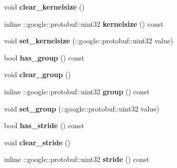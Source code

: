 \begin{DoxyCompactItemize}
void {\bfseries clear\+\_\+kernelsize} ()
\item 
\mbox{\label{classcaffe_1_1_v0_layer_parameter_a2039ba5348d4cca17386a80ba66043ca}} 
inline \+::google\+::protobuf\+::uint32 {\bfseries kernelsize} () const
\item 
\mbox{\label{classcaffe_1_1_v0_layer_parameter_a6a58c531a104ce76eb4df721dcf96f38}} 
void {\bfseries set\+\_\+kernelsize} (\+::google\+::protobuf\+::uint32 value)
\item 
\mbox{\label{classcaffe_1_1_v0_layer_parameter_ac11e4249cb00f5e912d9ad93afa9e13a}} 
bool {\bfseries has\+\_\+group} () const
\item 
\mbox{\label{classcaffe_1_1_v0_layer_parameter_af5c1bd1b8091003d1c8c41d645831b52}} 
void {\bfseries clear\+\_\+group} ()
\item 
\mbox{\label{classcaffe_1_1_v0_layer_parameter_a37765e6cfb839f95a3a108c8e8e1cb07}} 
inline \+::google\+::protobuf\+::uint32 {\bfseries group} () const
\item 
\mbox{\label{classcaffe_1_1_v0_layer_parameter_a05e35218fdd5b9c29e258d28f85f1db7}} 
void {\bfseries set\+\_\+group} (\+::google\+::protobuf\+::uint32 value)
\item 
\mbox{\label{classcaffe_1_1_v0_layer_parameter_a71a5225f6b623ff39cff74dc1eddbc81}} 
bool {\bfseries has\+\_\+stride} () const
\item 
\mbox{\label{classcaffe_1_1_v0_layer_parameter_a08da3f1300dab3558bb3bf934fa3f6a0}} 
void {\bfseries clear\+\_\+stride} ()
\item 
\mbox{\label{classcaffe_1_1_v0_layer_parameter_aa3ba4d065a936fe6f411560eedc52703}} 
inline \+::google\+::protobuf\+::uint32 {\bfseries stride} () const
\item 
\mbox{\label{classcaffe_1_1_v0_layer_parameter_a07f5ed5459469ebfb27617b26a6136a7}} 

\end{DoxyCompactItemize}
